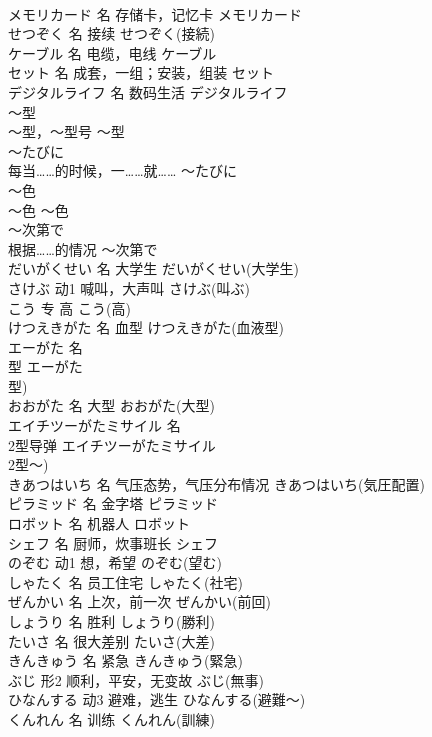 \documentclass[8pt]{extreport}
\begin{document}
\begin{CJK}{UTF8}{min}
\\	メモリカード	名	存储卡，记忆卡	メモリカード	
\\	せつぞく	名	接续	せつぞく(接続)	
\\	ケーブル	名	电缆，电线	ケーブル	
\\	セット	名	成套，一组；安装，组装	セット	
\\	デジタルライフ	名	数码生活	デジタルライフ	
\\	～型	
\\	～型，～型号	～型	
\\	～たびに	
\\	每当……的时候，一……就……	～たびに	
\\	～色	
\\	～色	～色	
\\	～次第で	
\\	根据……的情况	～次第で	
\\	だいがくせい	名	大学生	だいがくせい(大学生)	
\\	さけぶ	动1	喊叫，大声叫	さけぶ(叫ぶ)	
\\	こう	专	高	こう(高)	
\\	けつえきがた	名	血型	けつえきがた(血液型)	
\\	エーがた	名	
\\	型	エーがた
\\	型)	
\\	おおがた	名	大型	おおがた(大型)	
\\	エイチツーがたミサイル	名	
\\	2型导弹	エイチツーがたミサイル
\\	2型～)	
\\	きあつはいち	名	气压态势，气压分布情况	きあつはいち(気圧配置)	
\\	ピラミッド	名	金字塔	ピラミッド	
\\	ロボット	名	机器人	ロボット	
\\	シェフ	名	厨师，炊事班长	シェフ	
\\	のぞむ	动1	想，希望	のぞむ(望む)	
\\	しゃたく	名	员工住宅	しゃたく(社宅)	
\\	ぜんかい	名	上次，前一次	ぜんかい(前回)	
\\	しょうり	名	胜利	しょうり(勝利)	
\\	たいさ	名	很大差别	たいさ(大差)	
\\	きんきゅう	名	紧急	きんきゅう(緊急)	
\\	ぶじ	形2	顺利，平安，无变故	ぶじ(無事)	
\\	ひなんする	动3	避难，逃生	ひなんする(避難～)	
\\	くんれん	名	训练	くんれん(訓練)	

\end{CJK}
\end{document}

